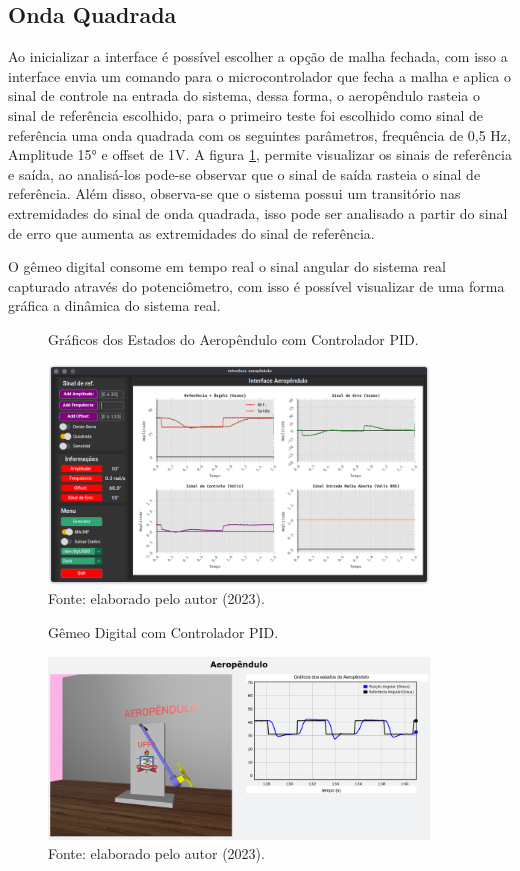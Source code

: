 \subsection{Onda Quadrada}

Ao inicializar a interface é possível escolher a opção de malha fechada, com isso a interface envia um comando para o microcontrolador que fecha a malha e aplica o sinal de controle na entrada do sistema, dessa forma, o aeropêndulo rasteia o sinal de referência escolhido, para o primeiro teste foi escolhido como sinal de referência uma onda quadrada com os seguintes parâmetros, frequência de 0,5 Hz, Amplitude 15° e offset de 1V. A figura \ref{fig3:image_24}, permite visualizar os sinais de referência e saída, ao analisá-los pode-se observar que o sinal de saída rasteia o sinal de referência. Além disso, observa-se que o sistema possui um transitório nas extremidades do sinal de onda quadrada, isso pode ser analisado a partir do sinal de erro que aumenta as extremidades do sinal de referência.

O gêmeo digital consome em tempo real o sinal angular do sistema real capturado através do potenciômetro, com isso é possível visualizar de uma forma gráfica a dinâmica do sistema real.

\begin{figure}[!h]
	\centering
	\caption{Gráficos dos Estados do Aeropêndulo com Controlador PID.}
	\includegraphics[width=0.9\textwidth]{Capitulos/3_1_resultados_discurcao/3_figuras/mf_gui_d1.png}
	\caption*{Fonte: elaborado pelo autor (2023).}
	\label{fig3:image_24}
\end{figure}


\begin{figure}[!h]
	\centering
	\caption{Gêmeo Digital com Controlador PID.}
	\includegraphics[width=0.9\textwidth]{Capitulos/3_1_resultados_discurcao/3_figuras/mf_gemeo_d1.png}
	\caption*{Fonte: elaborado pelo autor (2023).}
	\label{fig3:image_25}
\end{figure}


